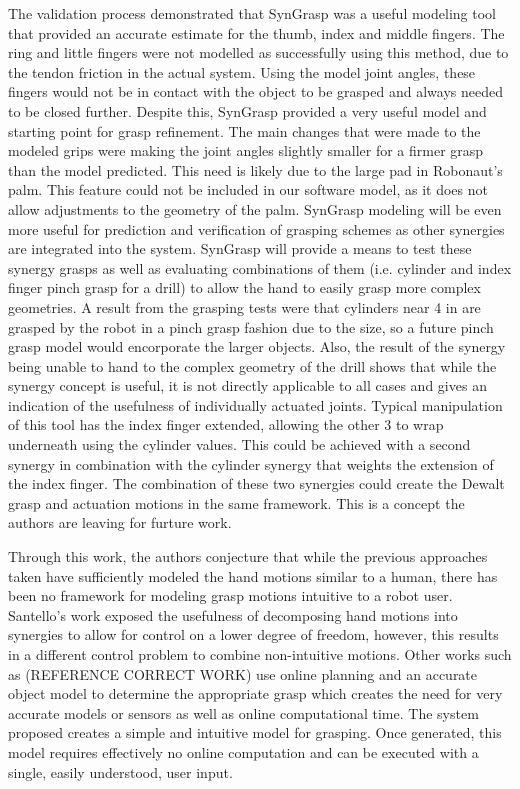 \documentclass[letterpaper, 10 pt, conference]{ieeeconf}  %
\begin{document}
	The validation process demonstrated that SynGrasp was a useful modeling tool that provided an accurate estimate for the thumb, index and middle fingers.  The ring and little fingers were not modelled as successfully using this method, due to the tendon friction in the actual system.  Using the model joint angles, these fingers would not be in contact with the object to be grasped and always needed to be closed further.  Despite this, SynGrasp provided a very useful model and starting point for grasp refinement.  The main changes that were made to the modeled grips were making the joint angles slightly smaller for a firmer grasp than the model predicted.  This need is likely due to the large pad in Robonaut’s palm.  This feature could not be included in our software model, as it does not allow adjustments to the geometry of the palm.  SynGrasp modeling will be even more useful for prediction and verification of grasping schemes as other synergies are integrated into the system.  SynGrasp will provide a means to test these synergy grasps as well as evaluating combinations of them (i.e. cylinder and index finger pinch grasp for a drill) to allow the hand to easily grasp more complex geometries.
              A result from the grasping tests were that cylinders near 4 in are grasped by the robot in a pinch grasp fashion due to the size, so a future pinch grasp model would encorporate the larger objects. Also, the result of the synergy being unable to hand to the complex geometry of the drill shows that while the synergy concept is useful, it is not directly applicable to all cases and gives an indication of the usefulness of individually actuated joints. Typical manipulation of this tool has the index finger extended, allowing the other 3 to wrap underneath using the cylinder values. This could be achieved with a second synergy in combination with the cylinder synergy that weights the extension of the index finger. The combination of these two synergies could create the Dewalt grasp and actuation motions in the same framework. This is a concept the authors are leaving for furture work. 

Through this work, the authors conjecture that while the previous approaches taken have sufficiently modeled the hand motions similar to a human, there has been no framework for modeling grasp motions intuitive to a robot user. Santello's work exposed the usefulness of decomposing hand motions into synergies to allow for control on a lower degree of freedom, however, this results in a different control problem to combine non-intuitive motions. Other works such as (REFERENCE CORRECT WORK) use online planning and an accurate object model to determine the appropriate grasp which creates the need for very accurate models or sensors as well as online computational time. The system proposed creates a simple and intuitive model for grasping. Once generated, this model requires effectively no online computation and can be executed with a single, easily understood, user input. 
\end{document}
